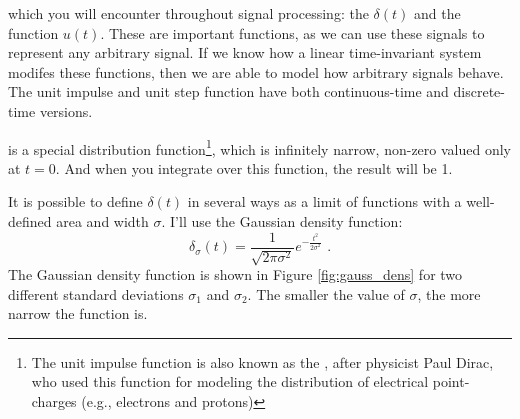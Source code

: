 %
% 
%
 which you will encounter
throughout signal processing: the \emph{} $\delta(t)$ and the \emph{}
function $u(t)$. These are important functions, as we can use these
signals to represent any arbitrary signal. If we know how a linear
time-invariant system modifes these functions, then we are able to
model how arbitrary signals behave. The unit impulse and unit step
function have both continuous-time and discrete-time versions.


 is a special distribution
function\footnote{The unit impulse function is also known as the
  \emph{}, after physicist Paul Dirac,
  who used this function for modeling the distribution of electrical point-charges (e.g., electrons and protons)},
which is infinitely narrow, non-zero valued only at $t=0$.
And when you integrate over this function, the result will be 1.

It is possible to define $\delta(t)$ in several ways as a limit of functions with a well-defined area and width $\sigma$.
I'll use the Gaussian density function:
\begin{equation}
  \delta_\sigma(t) = \frac{1}{\sqrt{2\pi \sigma^2}}e^{-\frac{t^2}{2\sigma^2}}\,\,.
\end{equation}
The Gaussian density function is shown in Figure \ref{fig:gauss_dens} for
two different standard deviations $\sigma_1$ and $\sigma_2$.
The smaller the value of $\sigma$, the more narrow the function is.

